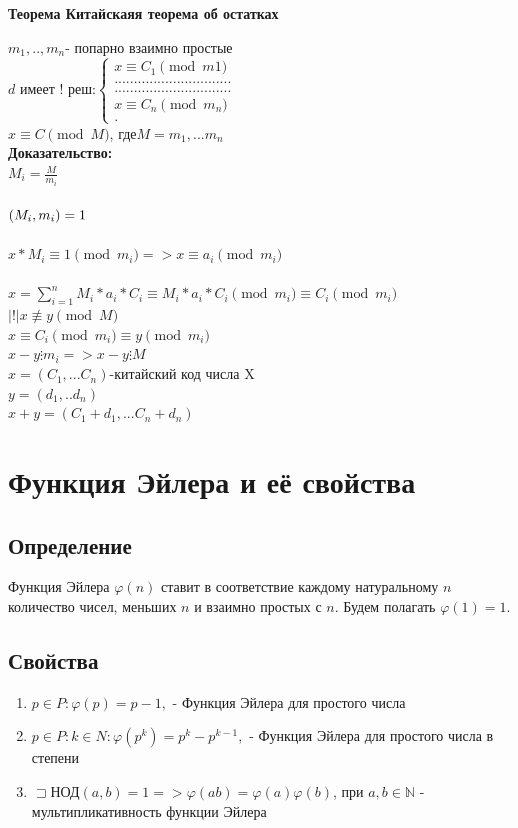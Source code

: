 \documentclass[12pt]{article}
\let\gcd\relax
\DeclareMathOperator{\gcd}{НОД}
\begin{document}
\textbf{Теорема Китайскаяя теорема об остатках}

$m_1,..,m_n $- попарно взаимно простые \\

$
    d \text{ имеет ! реш:}\left\{
    \begin{aligned}
        x \equiv C_1 \pmod{m1}         \\
        .............................. \\
        .............................. \\
        x \equiv C_n \pmod{m_n}        \\.
    \end{aligned}
    \right.
$\\
$x\equiv C\pmod{M} $, где$M = m_1,...m_n$\\

\textbf{Доказательство:}\\
$M_i=\frac{M}{m_i}$\\
\\
$\gcd(M_i, m_i) = 1 $\\
\\
$x*M_i\equiv 1\pmod{m_i} => x\equiv a_i\pmod{m_i} $\\
\\
$x = \sum_{i=1}^{n} M_i*a_i*C_i\equiv M_i*a_i*C_i\pmod{m_i}\equiv C_i\pmod{m_i} $\\
$|!| x \not\equiv y \pmod{M} $\\
$x\equiv C_i\pmod{m_i}\equiv y\pmod{m_i}$\\
$x-y\vdots m_i => x-y\vdots M$\\
$x = (C_1,...C_n)$-китайский код числа X\\
$y = (d_1,..d_n)$\\
$x+y = (C_1+d_1,...C_n+d_n)$

\setcounter{section}{7}

\section{Функция Эйлера и её свойства}

\subsection{Определение} Функция Эйлера $\varphi(n)$ ставит в соответствие каждому натуральному $n$ количество чисел, меньших $n$ и взаимно простых с $n$. Будем полагать $\varphi(1)=1$.

\subsection{Свойства}
\begin{enumerate}
    \item $p\in P:\varphi(p)=p-1,$ - Функция Эйлера для простого числа
    \item $p\in P:k\in N:\varphi(p^{k})=p^{k}-p^{k-1},$ - Функция Эйлера для простого числа в степени
    \item $\sqsupset$НОД$(a,b)=1=>\varphi(ab)=\varphi(a)\varphi(b)$, при $a,b\in \mathbb{N}$ - мультипликативность функции Эйлера
\end{enumerate}
\end{document}
